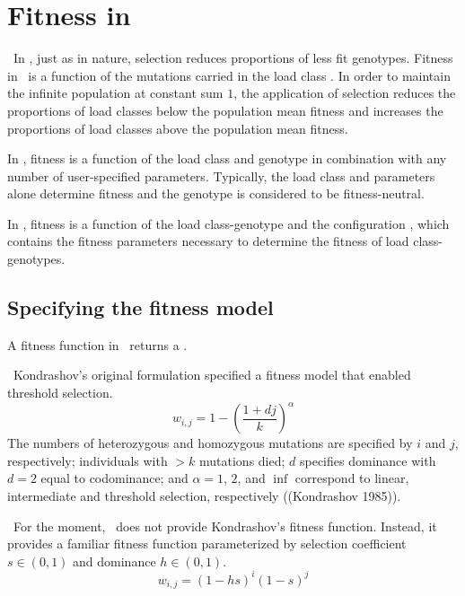 % 

\chapter{Fitness in \K}

\REDO\  In \K, just as in nature, selection reduces proportions of less fit genotypes.  Fitness in \K\ is a function of the mutations carried in the load class \Lij.  In order to maintain the infinite population at constant sum $1$, the application of selection reduces the proportions of load classes below the population mean fitness and increases the proportions of load classes above the population mean fitness.

In \K, fitness is a function of the load class and genotype in combination with any number of user-specified parameters.  Typically, the load class and parameters alone determine fitness and the genotype is considered to be fitness-neutral.

In \K, fitness is a function of the load class-genotype and the configuration \KConfig, which contains the fitness parameters necessary to determine the fitness of load class-genotypes.

\section{Specifying the fitness model}

A fitness function in \K\ returns a \KScalar.

\REDO\  Kondrashov's original formulation specified a fitness model that enabled threshold selection.
\begin{equation}
w_{i,j}=1-\left({\frac{1+dj}{k}}\right)^\alpha
\end{equation}
The numbers of heterozygous and homozygous mutations are specified by $i$ and $j$, respectively; individuals with $>k$ mutations died; $d$ specifies dominance with $d=2$ equal to codominance; and $\alpha=1$, $2$, and $\inf$ correspond to linear, intermediate and threshold selection, respectively ((Kondrashov 1985)).

\REDO\  For the moment, \K\ does not provide Kondrashov's fitness function.  Instead, it provides a familiar fitness function parameterized by selection coefficient $s\in(0,1)$ and dominance $h\in(0,1)$.
\begin{equation}
w_{i,j}=(1-hs)^{i}(1-s)^{j}
\end{equation}

